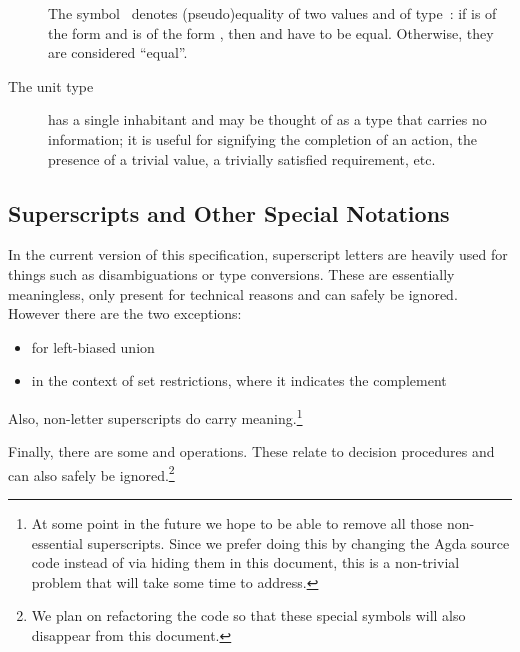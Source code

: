 \begin{description}
The symbol~\AgdaDatatype{\sim} denotes (pseudo)equality of two values  and
 of type~\AgdaSpace{}: if
 is of the form
\AgdaSpace{} and  is
of the form \AgdaSpace{}, then
 and  have to be equal. Otherwise, they are
considered ``equal''.
\item[The unit type]  has a single inhabitant  and may be thought
of as a type that carries no information; it is useful for signifying the completion of an action, the
presence of a trivial value, a trivially satisfied requirement, etc.
\end{description}

\subsection{Superscripts and Other Special Notations}
\label{sec:superscripts-other-special-notation}
In the current version of this specification, superscript letters are
heavily used for things such as disambiguations or type
conversions. These are essentially meaningless, only present for
technical reasons and can safely be ignored. However there are the
two exceptions:
\begin{itemize}
  \item {} for left-biased union
  \item {} in the context of set restrictions, where it indicates the complement
\end{itemize}
Also, non-letter superscripts do carry meaning.\footnote{At some point in the future we
  hope to be able to remove all those non-essential superscripts.  Since we prefer doing
  this by changing the Agda source code instead of via hiding them in this document, this
  is a non-trivial problem that will take some time to address.}

Finally, there are some  and  operations.
These relate to decision procedures and can also safely be ignored.\footnote{We
  plan on refactoring the code so that these special symbols will also disappear
  from this document.}
